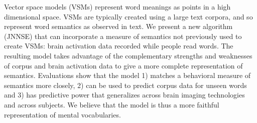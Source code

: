 Vector space models (VSMs) represent word meanings as points in a high dimensional space. VSMs are typically created using a large text corpora, and so represent word semantics as observed in text. We present a new algorithm (JNNSE) that can incorporate a measure of semantics not previously used to create VSMs: brain activation data recorded while people read words. The resulting model takes advantage of the complementary strengths and weaknesses of corpus and brain activation data to give a more complete representation of semantics. Evaluations show that the model 1) matches a behavioral measure of semantics more closely, 2) can be used to predict corpus data for unseen words and 3) has predictive power that generalizes across brain imaging technologies and across subjects. We believe that the model is thus a more faithful representation of mental vocabularies.
